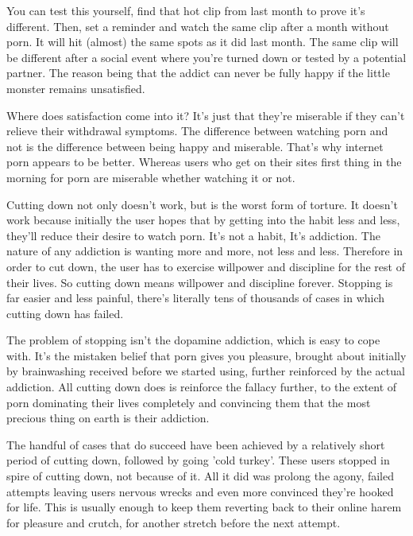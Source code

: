 \documentclass[easypeasy.tex]{subfiles}
\begin{document}
You can test this yourself, find that hot clip from last month to prove it's different. Then, set a reminder and watch the same clip after a month without porn. It will hit (almost) the same spots as it did last month. The same clip will be different after a social event where you're turned down or tested by a potential partner. The reason being that the addict can never be fully happy if the little monster remains unsatisfied.

Where does satisfaction come into it? It's just that they're miserable if they can't relieve their withdrawal symptoms. The difference between watching porn and not is the difference between being happy and miserable. That's why internet porn appears to be better. Whereas users who get on their sites first thing in the morning for porn are miserable whether watching it or not.

Cutting down not only doesn't work, but is the worst form of torture. It doesn't work because initially the user hopes that by getting into the habit less and less, they'll reduce their desire to watch porn. It's not a habit, It's addiction. The nature of any addiction is wanting more and more, not less and less. Therefore in order to cut down, the user has to exercise willpower and discipline for the rest of their lives. So cutting down means willpower and discipline forever. Stopping is far easier and less painful, there's literally tens of thousands of cases in which cutting down has failed.

The problem of stopping isn't the dopamine addiction, which is easy to cope with. It's the mistaken belief that porn gives you pleasure, brought about initially by brainwashing received before we started using, further reinforced by the actual addiction. All cutting down does is reinforce the fallacy further, to the extent of porn dominating their lives completely and convincing them that the most precious thing on earth is their addiction.

The handful of cases that do succeed have been achieved by a relatively short period of cutting down, followed by going 'cold turkey'. These users stopped in spire of cutting down, not because of it. All it did was prolong the agony, failed attempts leaving users nervous wrecks and even more convinced they're hooked for life. This is usually enough to keep them reverting back to their online harem for pleasure and crutch, for another stretch before the next attempt.
\end{document}
